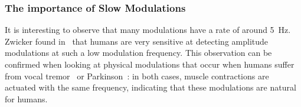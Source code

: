 \subsubsection*{The importance of Slow Modulations}

It is interesting to observe that many modulations have a rate of around 5~\si{\hertz}. 
Zwicker found in~\cite{zwicker52} that humans are very sensitive at detecting amplitude modulations at such a low modulation frequency.
This observation can be confirmed when looking at physical modulations that occur when humans suffer from vocal tremor~\cite{ramig87} or Parkinson~\cite{botzel14}: in both cases, muscle contractions are actuated with the same frequency, indicating that these modulations are natural for humans.


